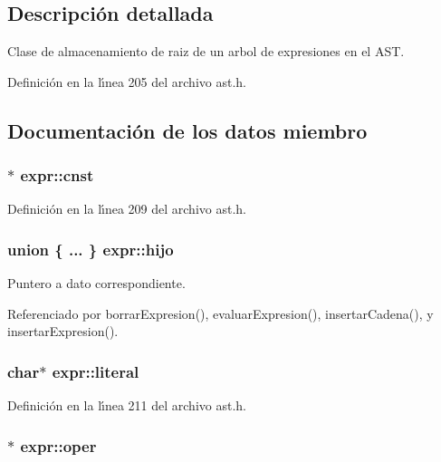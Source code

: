 \subsection{Descripci\'{o}n detallada}
Clase de almacenamiento de raiz de un arbol de expresiones en el AST. 



Definici\'{o}n en la l\'{\i}nea 205 del archivo ast.h.

\subsection{Documentaci\'{o}n de los datos miembro}
\subsubsection{$\ast$ {\bf expr::cnst}}\label{structexpr_o2}




Definici\'{o}n en la l\'{\i}nea 209 del archivo ast.h.
\subsubsection{\setlength{\rightskip}{0pt plus 5cm}union \{ ... \}  {\bf expr::hijo}}\label{structexpr_o5}


Puntero a dato correspondiente. 



Referenciado por borrar\-Expresion(), evaluar\-Expresion(), insertar\-Cadena(), y insertar\-Expresion().
\subsubsection{\setlength{\rightskip}{0pt plus 5cm}char$\ast$ {\bf expr::literal}}\label{structexpr_o4}




Definici\'{o}n en la l\'{\i}nea 211 del archivo ast.h.
\subsubsection{$\ast$ {\bf expr::oper}}\label{structexpr_o1}




